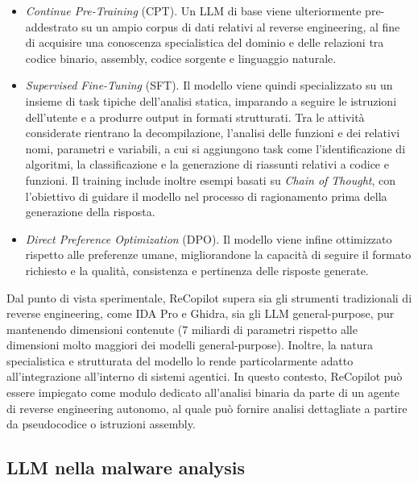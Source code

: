 \begin{description}
    \begin{itemize}
        \item \textit{Continue Pre-Training} (CPT). Un LLM di base viene ulteriormente pre-addestrato su un ampio corpus di dati relativi al reverse engineering, al fine di acquisire una conoscenza specialistica del dominio e delle relazioni tra codice binario, assembly, codice sorgente e linguaggio naturale.

        \item \textit{Supervised Fine-Tuning} (SFT). Il modello viene quindi specializzato su un insieme di task tipiche dell'analisi statica, imparando a seguire le istruzioni dell'utente e a produrre output in formati strutturati. Tra le attività considerate rientrano la decompilazione, l'analisi delle funzioni e dei relativi nomi, parametri e variabili, a cui si aggiungono task come l'identificazione di algoritmi, la classificazione e la generazione di riassunti relativi a codice e funzioni. Il training include inoltre esempi basati su \textit{Chain of Thought}, con l'obiettivo di guidare il modello nel processo di ragionamento prima della generazione della risposta.

        \item \textit{Direct Preference Optimization} (DPO). Il modello viene infine ottimizzato rispetto alle preferenze umane, migliorandone la capacità di seguire il formato richiesto e la qualità, consistenza e pertinenza delle risposte generate.
    \end{itemize}

    Dal punto di vista sperimentale, ReCopilot supera sia gli strumenti tradizionali di reverse engineering, come IDA Pro e Ghidra, sia gli LLM general-purpose, pur mantenendo dimensioni contenute (7 miliardi di parametri rispetto alle dimensioni molto maggiori dei modelli general-purpose). Inoltre, la natura specialistica e strutturata del modello lo rende particolarmente adatto all'integrazione all'interno di sistemi agentici. In questo contesto, ReCopilot può essere impiegato come modulo dedicato all'analisi binaria da parte di un agente di reverse engineering autonomo, al quale può fornire analisi dettagliate a partire da pseudocodice o istruzioni assembly.

\end{description}

\subsection{LLM nella malware analysis}

